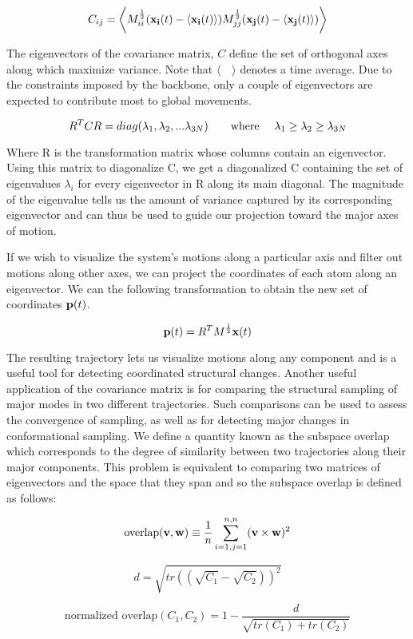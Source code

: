 \begin{equation}
C_{ij} = \bigg\langle M_{ii}^{\frac{1}{2}} (\mathbf{x_i}(t) - \langle \mathbf{x_i}(t) \rangle) M_{jj}^{\frac{1}{2}} (\mathbf{x_j}(t) - \langle \mathbf{x_j}(t) \rangle) \bigg\rangle
\end{equation}

The eigenvectors of the covariance matrix, $C$ define the set of orthogonal axes along which maximize variance. Note that $\langle \quad \rangle$ denotes a time average. Due to the constraints imposed by the backbone, only a couple of eigenvectors are expected to contribute most to global movements.

\begin{equation}
R^{T}CR = diag(\lambda_1, \lambda_2, ... \lambda_{3N}) \text{\qquad where \quad} \lambda_1 \geq \lambda_2 \geq \lambda_{3N}
\end{equation}

Where R is the transformation matrix whose columns contain an eigenvector. Using this matrix to diagonalize C, we get a diagonalized C containing the set of eigenvalues $\lambda_i$ for every eigenvector in R along its main diagonal. The magnitude of the eigenvalue tells us the amount of variance captured by its corresponding eigenvector and can thus be used to guide our projection toward the major axes of motion.

If we wish to visualize the system's motions along a particular axis and filter out motions along other axes, we can project the coordinates of each atom along an eigenvector. We can the following transformation to obtain the new set of coordinates $\mathbf{p}(t)$.

\begin{equation}
\mathbf{p}(t) = R^{T}M^{\frac{1}{2}}\mathbf{x}(t)
\end{equation}

The resulting trajectory lets us visualize motions along any component and is a useful tool for detecting coordinated structural changes. Another useful application of the covariance matrix is for comparing the structural sampling of major modes in two different trajectories. Such comparisons can be used to assess the convergence of sampling, as well as for detecting major changes in conformational sampling. We define a quantity known as the subspace overlap which corresponds to the degree of similarity between two trajectories along their major components. This problem is equivalent to comparing two matrices of eigenvectors and the space that they span and so the subspace overlap is defined as follows:

\begin{equation}
\text{overlap}(\mathbf{v}, \mathbf{w}) \equiv \frac{1}{n} \sum_{i=1, j=1}^{n,n} (\mathbf{v} \times \mathbf{w}) ^ 2
\end{equation}

\begin{equation}
d = \sqrt{tr((\sqrt{C_1} - \sqrt{C_2}))^2}
\end{equation}

\begin{equation}
\text{normalized overlap} (C_1, C_2) = 1 - \frac{d}{\sqrt{tr(C_1) + tr(C_2)}}
\end{equation}


